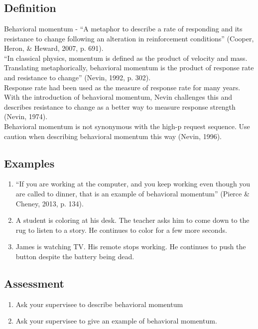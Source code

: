\clearpage \section{\fourFKThirtyNine{}}
\subsection{Definition}
Behavioral momentum - ``A metaphor to describe a rate of responding and its resistance to change following an alteration in reinforcement conditions'' (Cooper, Heron, \& Heward, 2007, p. 691).\\

``In classical physics, momentum is defined as the product of velocity and mass. Translating metaphorically, behavioral momentum is the product of response rate and resistance to change'' (Nevin, 1992, p. 302).\\

Response rate had been used as the measure of response rate for many years. With the introduction of behavioral momentum, Nevin challenges this and describes resistance to change as a better way to measure response strength (Nevin, 1974).\\

Behavioral momentum is not synonymous with the high-p request sequence. Use caution when describing behavioral momentum this way (Nevin, 1996).\\
%
\subsection{Examples}
\begin{enumerate}
\item ``If you are working at the computer, and you keep working even though you are called to dinner, that is an example of behavioral momentum'' (Pierce \& Cheney, 2013, p. 134).
\item A student is coloring at his desk. The teacher asks him to come down to the rug to listen to a story. He continues to color for a few more seconds.
\item James is watching TV. His remote stops working. He continues to push the button despite the battery being dead.
%
\end{enumerate}
%
\subsection{Assessment}
\begin{enumerate}
\item Ask your supervisee to describe behavioral momentum
\item Ask your supervisee to give an example of behavioral momentum.
%
\end{enumerate}
%
